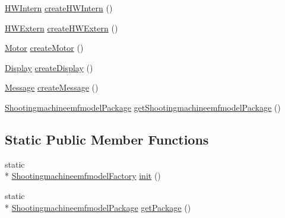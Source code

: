 \begin{DoxyCompactItemize}
\item 
\hyperlink{interfaceshootingmachineemfmodel_1_1_h_w_intern}{H\-W\-Intern} \hyperlink{classshootingmachineemfmodel_1_1impl_1_1_shootingmachineemfmodel_factory_impl_a927b49d403cdcdb092377afdc500d15b}{create\-H\-W\-Intern} ()
\item 
\hyperlink{interfaceshootingmachineemfmodel_1_1_h_w_extern}{H\-W\-Extern} \hyperlink{classshootingmachineemfmodel_1_1impl_1_1_shootingmachineemfmodel_factory_impl_a63509bed04a6306ff8f9d14462e5e853}{create\-H\-W\-Extern} ()
\item 
\hyperlink{interfaceshootingmachineemfmodel_1_1_motor}{Motor} \hyperlink{classshootingmachineemfmodel_1_1impl_1_1_shootingmachineemfmodel_factory_impl_a24be7db87b17dfde694e02cf8c0a0785}{create\-Motor} ()
\item 
\hyperlink{interfaceshootingmachineemfmodel_1_1_display}{Display} \hyperlink{classshootingmachineemfmodel_1_1impl_1_1_shootingmachineemfmodel_factory_impl_a574fde848121b44a30d65b10dd8b9e4b}{create\-Display} ()
\item 
\hyperlink{interfaceshootingmachineemfmodel_1_1_message}{Message} \hyperlink{classshootingmachineemfmodel_1_1impl_1_1_shootingmachineemfmodel_factory_impl_a36e14fcb3160ccb3a17aac1f4f540928}{create\-Message} ()
\item 
\hyperlink{interfaceshootingmachineemfmodel_1_1_shootingmachineemfmodel_package}{Shootingmachineemfmodel\-Package} \hyperlink{classshootingmachineemfmodel_1_1impl_1_1_shootingmachineemfmodel_factory_impl_a5be7339d632e63e642b64f8455f19dea}{get\-Shootingmachineemfmodel\-Package} ()
\end{DoxyCompactItemize}
\subsection*{Static Public Member Functions}
\begin{DoxyCompactItemize}
\item 
static \\*
\hyperlink{interfaceshootingmachineemfmodel_1_1_shootingmachineemfmodel_factory}{Shootingmachineemfmodel\-Factory} \hyperlink{classshootingmachineemfmodel_1_1impl_1_1_shootingmachineemfmodel_factory_impl_ad0841c6b6e65880d7b7bcbb789a25bd0}{init} ()
\item 
static \\*
\hyperlink{interfaceshootingmachineemfmodel_1_1_shootingmachineemfmodel_package}{Shootingmachineemfmodel\-Package} \hyperlink{classshootingmachineemfmodel_1_1impl_1_1_shootingmachineemfmodel_factory_impl_a912fc2ef13bd2e8017469fae9a541706}{get\-Package} ()
\end{DoxyCompactItemize}
